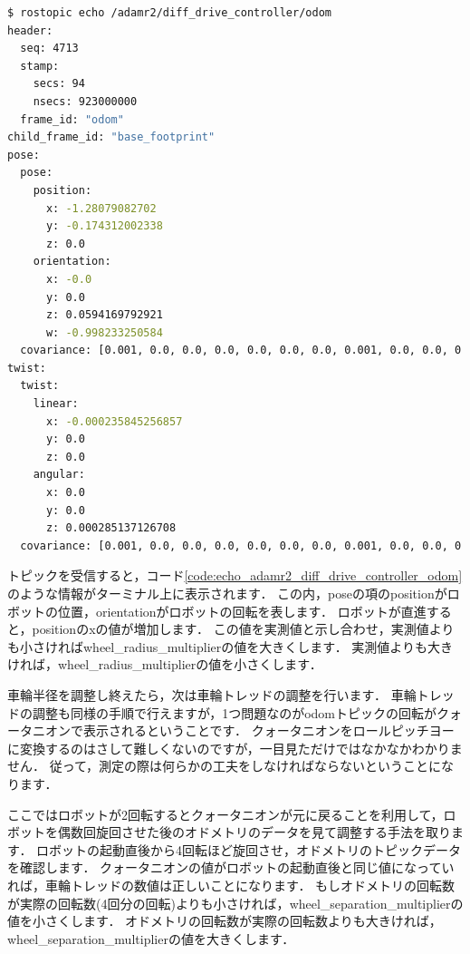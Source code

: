 \documentclass[{../../master}]{subfiles}
\begin{document}
\begin{lstlisting}[language=sh, label=code:echo_adamr2_diff_drive_controller_odom, caption=Show Odometry Topic Message]
$ rostopic echo /adamr2/diff_drive_controller/odom
header: 
  seq: 4713
  stamp: 
    secs: 94
    nsecs: 923000000
  frame_id: "odom"
child_frame_id: "base_footprint"
pose: 
  pose: 
    position: 
      x: -1.28079082702
      y: -0.174312002338
      z: 0.0
    orientation: 
      x: -0.0
      y: 0.0
      z: 0.0594169792921
      w: -0.998233250584
  covariance: [0.001, 0.0, 0.0, 0.0, 0.0, 0.0, 0.0, 0.001, 0.0, 0.0, 0.0, 0.0, 0.0, 0.0, 1000000.0, 0.0, 0.0, 0.0, 0.0, 0.0, 0.0, 1000000.0, 0.0, 0.0, 0.0, 0.0, 0.0, 0.0, 1000000.0, 0.0, 0.0, 0.0, 0.0, 0.0, 0.0, 10.0]
twist: 
  twist: 
    linear: 
      x: -0.000235845256857
      y: 0.0
      z: 0.0
    angular: 
      x: 0.0
      y: 0.0
      z: 0.000285137126708
  covariance: [0.001, 0.0, 0.0, 0.0, 0.0, 0.0, 0.0, 0.001, 0.0, 0.0, 0.0, 0.0, 0.0, 0.0, 1000000.0, 0.0, 0.0, 0.0, 0.0, 0.0, 0.0, 1000000.0, 0.0, 0.0, 0.0, 0.0, 0.0, 0.0, 1000000.0, 0.0, 0.0, 0.0, 0.0, 0.0, 0.0, 10.0]
\end{lstlisting}

トピックを受信すると，コード\ref{code:echo_adamr2_diff_drive_controller_odom}のような情報がターミナル上に表示されます．
この内，\textsf{pose}の項の\textsf{position}がロボットの位置，\textsf{orientation}がロボットの回転を表します．
ロボットが直進すると，\textsf{position}の\textsf{x}の値が増加します．
この値を実測値と示し合わせ，実測値よりも小さければ\textsf{wheel\_radius\_multiplier}の値を大きくします．
実測値よりも大きければ，\textsf{wheel\_radius\_multiplier}の値を小さくします．

車輪半径を調整し終えたら，次は車輪トレッドの調整を行います．
車輪トレッドの調整も同様の手順で行えますが，1つ問題なのが\textsf{odom}トピックの回転がクォータニオンで表示されるということです．
クォータニオンをロールピッチヨーに変換するのはさして難しくないのですが，一目見ただけではなかなかわかりません．
従って，測定の際は何らかの工夫をしなければならないということになります．

ここではロボットが2回転するとクォータニオンが元に戻ることを利用して，ロボットを偶数回旋回させた後のオドメトリのデータを見て調整する手法を取ります．
ロボットの起動直後から4回転ほど旋回させ，オドメトリのトピックデータを確認します．
クォータニオンの値がロボットの起動直後と同じ値になっていれば，車輪トレッドの数値は正しいことになります．
もしオドメトリの回転数が実際の回転数(4回分の回転)よりも小さければ，\textsf{wheel\_separation\_multiplier}の値を小さくします．
オドメトリの回転数が実際の回転数よりも大きければ，\textsf{wheel\_separation\_multiplier}の値を大きくします．
\end{document}
